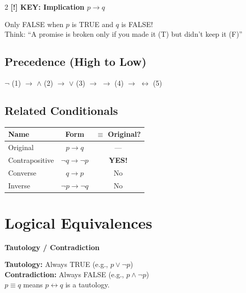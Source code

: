 \documentclass[8pt,a4paper]{article}
\newenvironment{defbox}[1][]{\vspace{2pt}\noindent\textbf{#1}\par\smallskip}{\vspace{2pt}}
\newenvironment{warnbox}[1][]{\vspace{2pt}\noindent\textbf{[!] #1}\par\smallskip}{\vspace{2pt}}
\begin{document}
\begin{multicols}{2}
\begin{warnbox}[KEY: Implication $p \to q$]
Only FALSE when $p$ is TRUE and $q$ is FALSE!\\
Think: ``A promise is broken only if you made it (T) but didn't keep it (F)''
\end{warnbox}

\subsection{Precedence (High to Low)}
$\neg$ (1) $\to$ $\land$ (2) $\to$ $\lor$ (3) $\to$ $\to$ (4) $\to$ $\leftrightarrow$ (5)

\subsection{Related Conditionals}
\begin{center}
\scriptsize
\begin{tabular}{l|c|c}
\textbf{Name} & \textbf{Form} & \textbf{$\equiv$ Original?} \\
\hline
Original & $p \to q$ & --- \\
Contrapositive & $\neg q \to \neg p$ & \textbf{YES!} \\
Converse & $q \to p$ & No \\
Inverse & $\neg p \to \neg q$ & No \\
\end{tabular}
\end{center}

\section{Logical Equivalences}

\begin{defbox}[Tautology / Contradiction]
\textbf{Tautology:} Always TRUE (e.g., $p \lor \neg p$)\\
\textbf{Contradiction:} Always FALSE (e.g., $p \land \neg p$)\\
$p \equiv q$ means $p \leftrightarrow q$ is a tautology.
\end{defbox}


\end{multicols}
\end{document}

